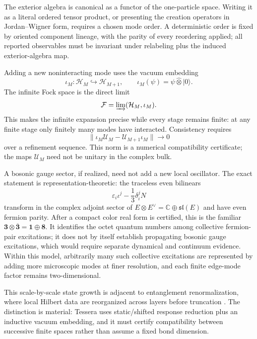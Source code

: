 \documentclass[11pt,letterpaper]{article}
\newcommand{\HK}{\mathcal{H}}
\newcommand{\gtens}{\mathbin{\widehat{\otimes}}}
\begin{document}
The exterior algebra is canonical as a functor of the one-particle space.
Writing it as a literal ordered tensor product, or presenting the creation
operators in Jordan--Wigner form, requires a chosen mode order. A deterministic
order is fixed by oriented component lineage, with the parity of every
reordering applied; all reported observables must be
invariant under relabeling plus the induced exterior-algebra map.

Adding a new noninteracting mode uses the vacuum embedding
\begin{equation*}
  \iota_{M}:\HK_{M}\hookrightarrow\HK_{M+1},
  \qquad
  \iota_{M}(\psi)=\psi\gtens\lvert 0\rangle.
\end{equation*}
The infinite Fock space is the direct limit
\begin{equation*}
  \mathcal{F}=\varinjlim(\HK_{M},\iota_{M}).
\end{equation*}
This makes the infinite expansion precise while every stage remains finite: at
any finite stage only finitely many modes have
interacted. Consistency requires
\begin{equation*}
  \lVert\iota_M\mathcal U_M-\mathcal U_{M+1}\iota_M\rVert
  \longrightarrow 0
\end{equation*}
over a refinement sequence. This norm is a numerical compatibility
certificate; the maps $\mathcal U_M$ need not be unitary in the complex bulk.

A bosonic gauge sector, if realized, need not add a new local oscillator. The
exact statement is representation-theoretic: the traceless even bilinears
\begin{equation*}
  \varepsilon_i\iota^j-\frac{1}{3}\delta_i^jN
\end{equation*}
transform in the complex adjoint sector of
$E\otimes E^\vee=\mathbb C\oplus\mathfrak{sl}(E)$ and have even fermion
parity. After a compact color real form is certified, this is the familiar
$\mathbf3\otimes\overline{\mathbf3}=\mathbf1\oplus\mathbf8$. It identifies
the octet quantum numbers among
collective fermion-pair excitations; it does not by itself establish
propagating bosonic gauge excitations, which would require separate dynamical
and continuum evidence. Within this model, arbitrarily many such collective
excitations are represented by adding more microscopic modes at finer
resolution, and each finite edge-mode factor remains two-dimensional.

This scale-by-scale state growth is adjacent to entanglement renormalization,
where local Hilbert data are reorganized across layers before truncation
\cite{vidal2007}. The distinction is material: Tessera uses static/shifted
response reduction plus an inductive vacuum embedding, and it must certify
compatibility between successive finite spaces rather than assume a fixed bond
dimension.
\end{document}
